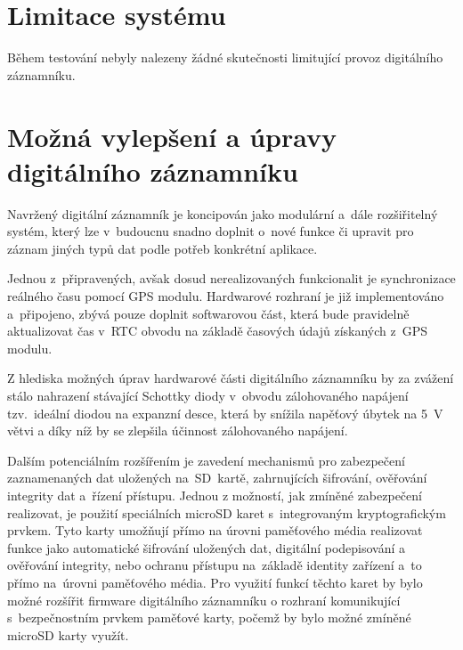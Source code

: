 
\section{Limitace systému}
\label{limitace}
Během testování nebyly nalezeny žádné skutečnosti limitující provoz digitálního záznamníku.



\section{Možná vylepšení a úpravy digitálního záznamníku}
\label{mozne_rozsireni}
Navržený digitální záznamník je koncipován jako modulární a~dále rozšiřitelný systém, který lze v~budoucnu snadno doplnit o~nové funkce či upravit pro záznam jiných typů dat podle potřeb konkrétní aplikace.

Jednou z~připravených, avšak dosud nerealizovaných funkcionalit je synchronizace reálného času pomocí GPS modulu. Hardwarové rozhraní je již implementováno a~připojeno, zbývá pouze doplnit softwarovou část, která bude pravidelně aktualizovat čas v~RTC obvodu na základě časových údajů získaných z~GPS modulu.

Z hlediska možných úprav hardwarové části digitálního záznamníku by za zvážení stálo nahrazení stávající Schottky diody v~obvodu zálohovaného napájení tzv.~ideální diodou na expanzní desce, která by snížila napěťový úbytek na \SI{5}{\volt} větvi a díky níž by se zlepšila účinnost zálohovaného napájení.

Dalším potenciálním rozšířením je zavedení mechanismů pro zabezpečení zaznamenaných dat uložených na~SD~kartě, zahrnujících šifrování, ověřování integrity dat a~řízení přístupu. Jednou z možností, jak zmíněné zabezpečení realizovat, je použití speciálních microSD karet s~integrovaným kryptografickým prvkem. Tyto karty umožňují přímo na úrovni paměťového média realizovat funkce jako automatické šifrování uložených dat, digitální podepisování a ověřování integrity, nebo ochranu přístupu na~základě identity zařízení a~to přímo na~úrovni paměťového média. Pro využití funkcí těchto karet by bylo možné rozšířit firmware digitálního záznamníku o rozhraní komunikující s~bezpečnostním prvkem paměťové karty, počemž by bylo možné zmíněné microSD karty využít.

